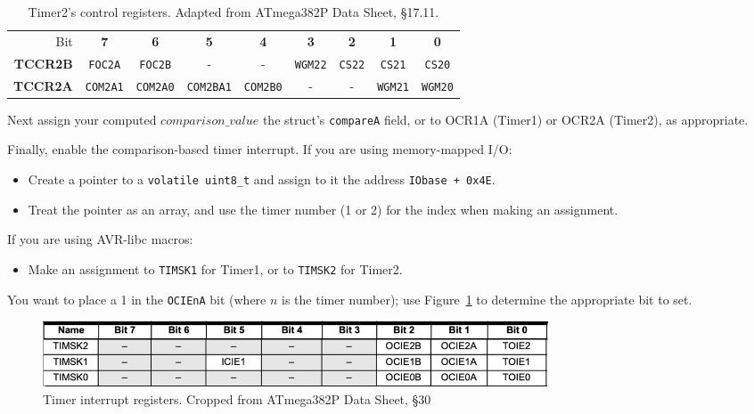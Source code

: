 \begin{table}
    \centering \small
    \begin{tabular}{|r||c|c|c|c|c|c|c|c||}
        \hline
        Bit             & \textbf{7}        & \textbf{6}        & \textbf{5}        & \textbf{4}        & \textbf{3}        & \textbf{2}    & \textbf{1}        & \textbf{0}        \\ \cline{2-9}
        \textbf{TCCR2B} & \texttt{FOC2A}    & \texttt{FOC2B}    & -                 & -                 & \texttt{WGM22}    & \texttt{CS22} & \texttt{CS21}     & \texttt{CS20}     \\
        \textbf{TCCR2A} & \texttt{COM2A1}   & \texttt{COM2A0}   & \texttt{COM2BA1}  & \texttt{COM2B0}   & -                 & -             & \texttt{WGM21}    & \texttt{WGM20}    \\ \hline
    \end{tabular}
    \caption{Timer2's control registers. \tiny Adapted from ATmega382P Data Sheet, §17.11. \label{table:Timer2Control}}
\end{table}

Next assign your computed $comparison\_value$ the struct's \lstinline{compareA}
field, or to OCR1A (Timer1) or OCR2A (Timer2), as appropriate.

Finally, enable the comparison-based timer interrupt. If you are using
memory-mapped I/O:
\begin{itemize}
\item Create a pointer to a \lstinline{volatile uint8_t} and assign to it the
    address \lstinline{IObase + 0x4E}.
\item Treat the pointer as an array, and use the timer number (1 or 2) for the
    index when making an assignment.
\end{itemize}
If you are using AVR-libc macros:
\begin{itemize}
\item Make an assignment to \texttt{TIMSK1} for Timer1, or to \texttt{TIMSK2}
    for Timer2.
\end{itemize}

You want to place a 1 in the \texttt{OCIEnA} bit (where $n$ is the timer
number); use Figure~\ref{fig:TimerInterruptRegisters} to determine the
appropriate bit to set.

\begin{figure}
    \centering
    \includegraphics[width=15cm]{TimerInterruptRegisters}
    \caption{Timer interrupt registers. \tiny Cropped from ATmega382P Data Sheet, §30 \label{fig:TimerInterruptRegisters}}
\end{figure}


